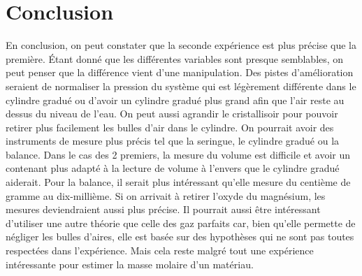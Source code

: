 \documentclass[11pt]{article}
\begin{document}
\section{Conclusion}
En conclusion, on peut constater que la seconde expérience est plus précise que la première. Étant donné que les différentes variables sont presque semblables, on peut penser que la différence vient d'une manipulation. Des pistes d'amélioration seraient de normaliser la pression du système qui est légèrement différente dans le cylindre gradué ou d'avoir un cylindre gradué plus grand afin que l'air reste au dessus du niveau de l'eau. On peut aussi agrandir le cristallisoir pour pouvoir retirer plus facilement les bulles d'air dans le cylindre. On pourrait avoir des instruments de mesure plus précis tel que la seringue, le cylindre gradué ou la balance. Dans le cas des 2 premiers, la mesure du volume est difficile et avoir un contenant plus adapté à la lecture de volume à l'envers que le cylindre gradué aiderait. Pour la balance, il serait plus intéressant qu'elle mesure du centième de gramme au dix-millième. Si on arrivait à retirer l'oxyde du magnésium, les mesures deviendraient aussi plus précise. Il pourrait aussi être intéressant d'utiliser une autre théorie que celle des gaz parfaits car, bien qu'elle permette de négliger les bulles d'aires, elle est basée sur des hypothèses qui ne sont pas toutes respectées dans l'expérience. Mais cela reste malgré tout une expérience intéressante pour estimer la masse molaire d'un matériau.
\end{document}
